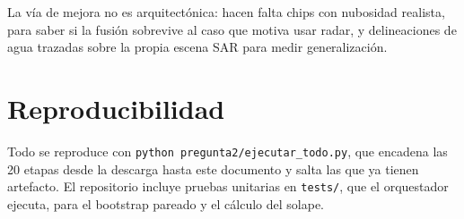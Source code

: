\documentclass{article}
\begin{document}
La vía de mejora no es arquitectónica: hacen falta chips con nubosidad realista,
para saber si la fusión sobrevive al caso que motiva usar radar, y delineaciones
de agua trazadas sobre la propia escena SAR para medir generalización.

\section*{Reproducibilidad}
Todo se reproduce con \texttt{python pregunta2/ejecutar\_todo.py}, que encadena
las 20 etapas desde la descarga hasta este documento y salta las que ya tienen
artefacto. El repositorio incluye pruebas unitarias en \texttt{tests/}, que el
orquestador ejecuta, para el bootstrap pareado y el cálculo del solape.



\end{document}
